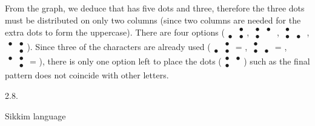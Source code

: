 \begin{refsection}
\begin{discussion}
From the graph, we deduce that  has five dots and  three, therefore the three dots must be distributed on only two columns (since two columns are needed for the extra dots to form the uppercase). There are four options ({\Large \boldmath$\begin{smallmatrix}
    &\bullet  \\  \bullet&\bullet 
\end{smallmatrix}$}, {\Large \boldmath$\begin{smallmatrix} 
    \bullet&\bullet  \\  \bullet &
\end{smallmatrix}$} , {\Large \boldmath$\begin{smallmatrix} 
    \bullet&  \\  \bullet &\bullet
\end{smallmatrix}$} , {\Large \boldmath$\begin{smallmatrix} 
    \bullet&\bullet  \\  &\bullet 
\end{smallmatrix}$}). Since three of the characters are already used ({\Large \boldmath$\begin{smallmatrix} 
    &\bullet  \\  \bullet&\bullet 
\end{smallmatrix}$} = , {\Large \boldmath$\begin{smallmatrix} 
    \bullet&  \\  \bullet &\bullet
\end{smallmatrix}$} = , {\Large \boldmath$\begin{smallmatrix} 
    \bullet&\bullet  \\  &\bullet 
\end{smallmatrix}$} = ), there is only one option left to place the dots ({\Large \boldmath$\begin{smallmatrix} 
    \bullet&\bullet  \\  \bullet &
\end{smallmatrix}$}) such as the final pattern does not coincide with other letters.
\end{discussion}


\begin{practiceproblemsolution}{2.8. \langnameLepcha}

\begin{solutions}[label=Solution 2.8\alph*]
    \item Sikkim language
    \item {} \hfill {} \hfill {} \hfill {}
    \item {}
\end{solutions}


\end{practiceproblemsolution}
\end{refsection}

